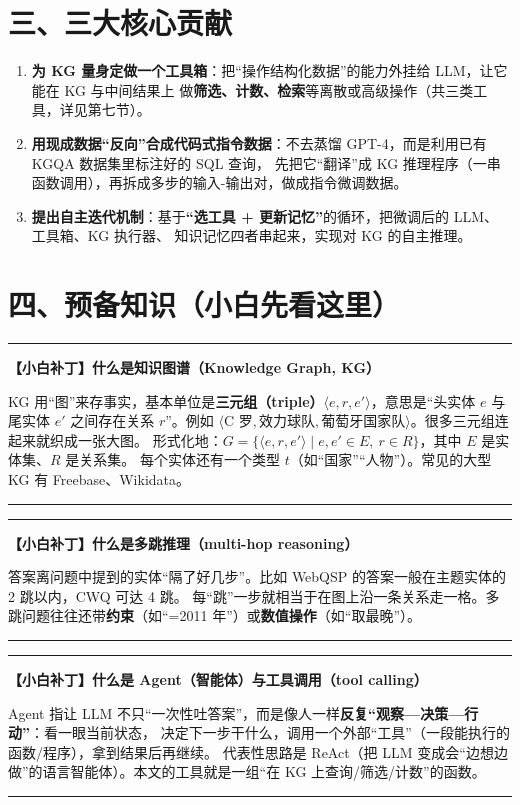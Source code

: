 \documentclass[11pt,UTF8,fontset=fandol]{ctexart}
\newenvironment{tip}[1]{%
  \par\smallskip\noindent\rule{\linewidth}{0.4pt}\par\nobreak
  \noindent\textbf{【小白补丁】#1}\par\nobreak\noindent\ignorespaces
}{%
  \par\noindent\rule{\linewidth}{0.4pt}\par\smallskip
}
\begin{document}
\section{三、三大核心贡献}
\begin{enumerate}[leftmargin=2em]
  \item \textbf{为 KG 量身定做一个工具箱}：把“操作结构化数据”的能力外挂给 LLM，让它能在 KG 与中间结果上
        做\textbf{筛选、计数、检索}等离散或高级操作（共三类工具，详见第七节）。
  \item \textbf{用现成数据“反向”合成代码式指令数据}：不去蒸馏 GPT-4，而是利用已有 KGQA 数据集里标注好的 SQL 查询，
        先把它“翻译”成 KG 推理程序（一串函数调用），再拆成多步的输入-输出对，做成指令微调数据。
  \item \textbf{提出自主迭代机制}：基于\textbf{“选工具 + 更新记忆”}的循环，把微调后的 LLM、工具箱、KG 执行器、
        知识记忆四者串起来，实现对 KG 的自主推理。
\end{enumerate}

\section{四、预备知识（小白先看这里）}

\begin{tip}{什么是知识图谱（Knowledge Graph, KG）}
KG 用“图”来存事实，基本单位是\textbf{三元组（triple）}$\langle e, r, e'\rangle$，意思是“头实体 $e$ 与尾实体 $e'$
之间存在关系 $r$”。例如 $\langle\text{C 罗}, \text{效力球队}, \text{葡萄牙国家队}\rangle$。很多三元组连起来就织成一张大图。
形式化地：$G=\{\langle e, r, e'\rangle \mid e, e'\in E,\ r\in R\}$，其中 $E$ 是实体集、$R$ 是关系集。
每个实体还有一个类型 $t$（如“国家”“人物”）。常见的大型 KG 有 Freebase、Wikidata。
\end{tip}

\begin{tip}{什么是多跳推理（multi-hop reasoning）}
答案离问题中提到的实体“隔了好几步”。比如 WebQSP 的答案一般在主题实体的 2 跳以内，CWQ 可达 4 跳。
每“跳”一步就相当于在图上沿一条关系走一格。多跳问题往往还带\textbf{约束}（如“=2011 年”）或\textbf{数值操作}（如“取最晚”）。
\end{tip}

\begin{tip}{什么是 Agent（智能体）与工具调用（tool calling）}
Agent 指让 LLM 不只“一次性吐答案”，而是像人一样\textbf{反复“观察—决策—行动”}：看一眼当前状态，
决定下一步干什么，调用一个外部“工具”（一段能执行的函数/程序），拿到结果后再继续。
代表性思路是 ReAct（把 LLM 变成会“边想边做”的语言智能体）。本文的工具就是一组“在 KG 上查询/筛选/计数”的函数。
\end{tip}
\end{document}

